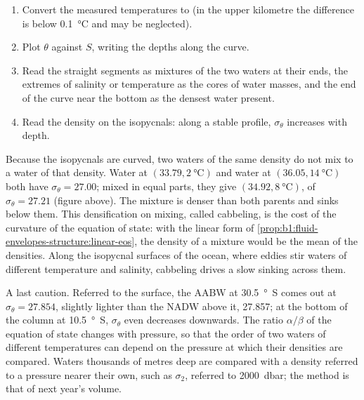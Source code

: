\begin{method}\label{met:b1:fluid-envelopes-structure:ts}
\begin{enumerate}
  \item Convert the measured temperatures to  (in the upper
        kilometre the difference is below \qty{0.1}{\celsius} and may be
        neglected).
  \item Plot $\theta$ against $S$, writing the depths along the curve.
  \item Read the straight segments as mixtures of the two waters at their ends,
        the extremes of salinity or temperature as the cores of water masses,
        and the end of the curve near the bottom as the densest water present.
  \item Read the density on the isopycnals: along a stable profile,
        $\sigma_\theta$ increases with depth.
\end{enumerate}
\end{method}

Because the isopycnals are curved, two waters of the same density do not mix to
a water of that density. Water at $(33.79, \qty{2}{\celsius})$ and water at
$(36.05, \qty{14}{\celsius})$ both have $\sigma_\theta = 27.00$; mixed in equal
parts, they give $(34.92, \qty{8}{\celsius})$, of $\sigma_\theta = 27.21$
(figure above). The mixture is denser than both parents and sinks below them.
This densification on mixing, called cabbeling, is the cost of the curvature of
the equation of state: with the linear form of
\cref{prop:b1:fluid-envelopes-structure:linear-eos}, the density of a mixture
would be the mean of the densities. Along the isopycnal surfaces of the ocean,
where eddies stir waters of different temperature and salinity, cabbeling drives
a slow sinking across them.

A last caution. Referred to the surface, the AABW at \qty{30.5}{\degree S} comes
out at $\sigma_\theta = 27.854$, slightly lighter than the NADW above it,
\num{27.857}; at the bottom of the column at \qty{10.5}{\degree S}, $\sigma_\theta$
even decreases downwards. The ratio $\alpha/\beta$ of the equation of state
changes with pressure, so that the order of two waters of different temperatures
can depend on the pressure at which their densities are compared. Waters
thousands of metres deep are compared with a density referred to a pressure
nearer their own, such as $\sigma_2$, referred to \qty{2000}{dbar}; the method
is that of next year's volume.

